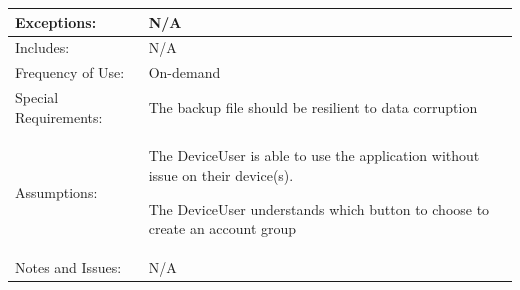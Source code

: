\documentclass[stu]{apa7}
\newcommand{\nextitem}{\par\hspace*{\labelsep}\textbullet\hspace*{\labelsep}}
\begin{document}
{\begin{xltabular}{\textwidth}{|l|X|}
  Exceptions: &
                N/A
              \\ \hline
  Includes: & N/A \\ \hline

  Frequency of Use: & On-demand \\ \hline

  Special Requirements: & \nextitem The backup file should be resilient to data corruption \\ \hline

  Assumptions: & \nextitem The DeviceUser is able to use the application without issue on their device(s). \nextitem The DeviceUser understands which button to choose to create an account group \\ \hline

  Notes and Issues: & N/A \\ \hline

\end{xltabular}}
\end{document}
